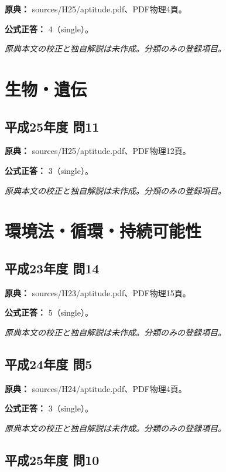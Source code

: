 \noindent\textbf{原典：} sources/H25/aptitude.pdf、PDF物理4頁。

\textbf{公式正答：} 4（single）。

\par\textit{原典本文の校正と独自解説は未作成。分類のみの登録項目。}

\section{生物・遺伝}

\subsection{平成25年度 問11}
\label{q:h25-reg-apt-11}

\noindent\textbf{原典：} sources/H25/aptitude.pdf、PDF物理12頁。

\textbf{公式正答：} 3（single）。

\par\textit{原典本文の校正と独自解説は未作成。分類のみの登録項目。}

\section{環境法・循環・持続可能性}

\subsection{平成23年度 問14}
\label{q:h23-reg-apt-14}

\noindent\textbf{原典：} sources/H23/aptitude.pdf、PDF物理15頁。

\textbf{公式正答：} 5（single）。

\par\textit{原典本文の校正と独自解説は未作成。分類のみの登録項目。}

\subsection{平成24年度 問5}
\label{q:h24-reg-apt-05}

\noindent\textbf{原典：} sources/H24/aptitude.pdf、PDF物理4頁。

\textbf{公式正答：} 3（single）。

\par\textit{原典本文の校正と独自解説は未作成。分類のみの登録項目。}

\subsection{平成25年度 問10}
\label{q:h25-reg-apt-10}

